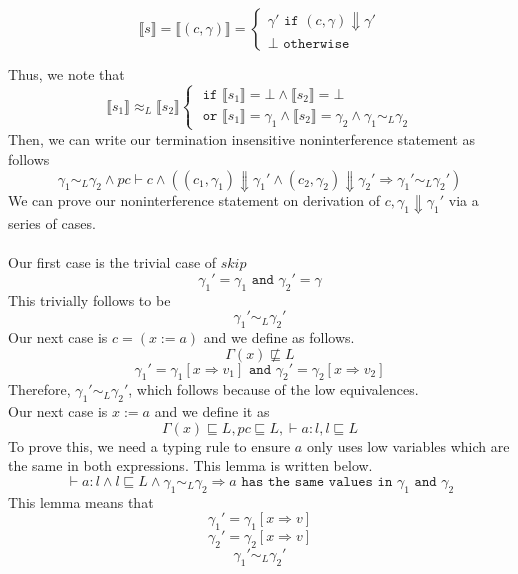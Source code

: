 \documentclass{article}
\begin{document}
  \[ \llbracket{} s \rrbracket{} = \llbracket (c, \gamma) \rrbracket = \begin{cases} 
   \gamma' \texttt{ if } (c, \gamma )\Downarrow \gamma' \\
   \bot \texttt{ otherwise}
   \end{cases}
\]

Thus, we note that \[\llbracket{} s_1\rrbracket{} \approx_L \llbracket{} s_2\rrbracket{} \begin{cases} \texttt{ if } \llbracket{}s_1 \rrbracket{}= \bot \wedge \llbracket{}s_2\rrbracket{}=\bot \\
\texttt{ or } \llbracket{}s_1\rrbracket{}=\gamma_1 \wedge \llbracket{}s_2\rrbracket{} =\gamma_2 \wedge \gamma_1 \sim_L \gamma_2\end{cases}\]
Then, we can write our termination insensitive noninterference statement as follows 
\[ \gamma_1\sim_L\gamma_2 \wedge pc \vdash c \wedge(( c_1, \gamma_1) \Downarrow \gamma_1' \wedge (c_2, \gamma_2) \Downarrow \gamma_2'\Rightarrow{} \gamma_1' \sim_L \gamma_2')\]
We can prove our noninterference statement on derivation of  $c, \gamma_1 \Downarrow \gamma_1'$ via a series of cases. \\\\
Our first case is the trivial case of $skip$  \[\gamma_1'=\gamma_1 \texttt{ and } \gamma_2'=\gamma\] 
This trivially follows to be \[\gamma_1'\sim_L \gamma_2'\]
Our next case is  $c=(x:=a)$  and we define as follows.
\[\Gamma(x) \not\sqsubseteq L \]\[
\gamma_1' =\gamma_1[x\Rightarrow{} v_1] \texttt{ and } \gamma_2' =\gamma_2[x\Rightarrow{} v_2]\] Therefore,  $\gamma_1'\sim_L \gamma_2'$, which follows because of the low equivalences. \\
Our next case is $x:=a$ and we define it as 
 \[ \Gamma(x) \sqsubseteq{} L, pc \sqsubseteq{} L , \vdash a: l, l \sqsubseteq{} L\] 
 To prove this, we need a typing rule to ensure $a$ only uses low variables which are the same in both expressions. This lemma is written below. 
 \[ \vdash a : l \wedge l \sqsubseteq{} L \wedge \gamma_1 \sim_L \gamma_2 \Rightarrow{} a \texttt{  has the same values in }\gamma_1 \texttt{ and } \gamma_2\]
This lemma means that  \[\gamma_1' =\gamma_1 [x\Rightarrow{} v]\] \[\gamma_2' =\gamma_2[x\Rightarrow{} v]\] \[ \gamma_1'\sim_L \gamma_2'\]
\end{document}
